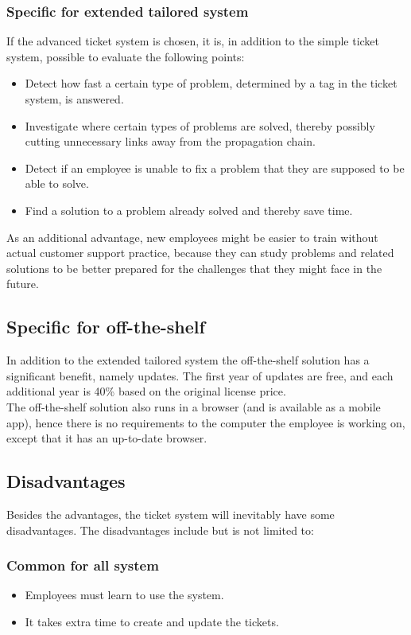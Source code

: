 \subsubsection{Specific for extended tailored system}
If the advanced ticket system is chosen, it is, in addition to the simple ticket system, possible to evaluate the following points:
\begin{itemize}
	\item Detect how fast a certain type of problem, determined by a tag in the ticket system, is answered.
	\item Investigate where certain types of problems are solved, thereby possibly cutting unnecessary links away from the propagation chain.
	\item Detect if an employee is unable to fix a problem that they are supposed to be able to solve.
	\item Find a solution to a problem already solved and thereby save time.
\end{itemize}
As an additional advantage, new employees might be easier to train without actual customer support practice, because they can study problems and related solutions to be better prepared for the challenges that they might face in the future.

\subsection{Specific for off-the-shelf}
In addition to the extended tailored system the off-the-shelf solution has a significant benefit, namely updates. The first year of updates are free, and each additional year is 40\% based on the original license price.\\
The off-the-shelf solution also runs in a browser (and is available as a mobile app), hence there is no requirements to the computer the employee is working on, except that it has an up-to-date browser.

\subsection{Disadvantages}
Besides the advantages, the ticket system will inevitably have some disadvantages. The disadvantages include but is not limited to:

\subsubsection{Common for all system}
\begin{itemize}
	\item Employees must learn to use the system.
	\item It takes extra time to create and update the tickets.
\end{itemize}

